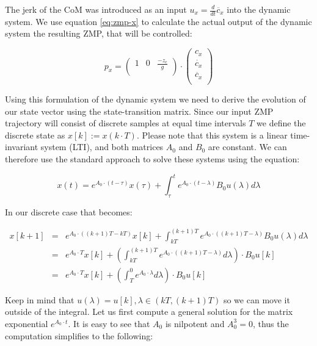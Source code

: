 \documentclass[english,ngerman]{KITreprt}
\begin{document}
The jerk of the CoM was introduced as an input
$u_x = \frac{d}{dt} \ddot{c_x}$ into the dynamic system. We use equation
\ref{eq:zmp-x} to calculate the actual output of the dynamic system the
resulting ZMP, that will be controlled:

\begin{equation} \label{eq:zmp-x-output}
p_x =
\left(\begin{array}{ccc}
1 & 0 & \frac{-z_c}{g} \\
\end{array}\right)
\cdot
\left(\begin{array}{c}
c_x \\
\dot{c_x} \\
\ddot{c_x} \\
\end{array}\right)
\end{equation}

Using this formulation of the dynamic system we need to derive the
evolution of our state vector using the state-transition matrix. Since
our input ZMP trajectory will consist of discrete samples at equal time
intervals $T$ we define the discrete state as $x[k] := x(k \cdot T)$.
Please note that this system is a linear time-invariant system (LTI),
and both matrices $A_0$ and $B_0$ are constant. We can therefore use the
standard approach to solve these systems using the equation:

\begin{equation}
x(t) = e^{A_0 \cdot (t - \tau)} x(\tau) + \int^t_\tau e^{A_0 \cdot (t - \lambda)} B_0 u(\lambda) d\lambda
\end{equation}

In our discrete case that becomes:

\begin{eqnarray} \label{eq:state-transition-discrete}
x[k+1] & = & e^{A_0 \cdot ((k+1)T - kT)} x[k] + \int^{(k+1)T}_{kT} e^{A_0 \cdot ((k+1)T - \lambda)} B_0 u(\lambda) d\lambda \\
       & = & e^{A_0 \cdot T} x[k] + \left(\int^{(k+1)T}_{kT} e^{A_0 \cdot ((k+1)T - \lambda)} d\lambda \right) \cdot B_0 u[k]\\
       & = & e^{A_0 \cdot T} x[k] + \left(\int^{0}_{T} e^{A_0 \cdot \lambda} d\lambda\right) \cdot B_0 u[k]
\end{eqnarray}

Keep in mind that $u(\lambda) = u[k], \lambda \in (kT, (k+1)T)$ so we
can move it outside of the integral. Let us first compute a general
solution for the matrix exponential $e^{A_0 \cdot t}$. It is easy to see
that $A_0$ is nilpotent and $A_0^3 = 0$, thus the computation simplifies
to the following:
\end{document}
